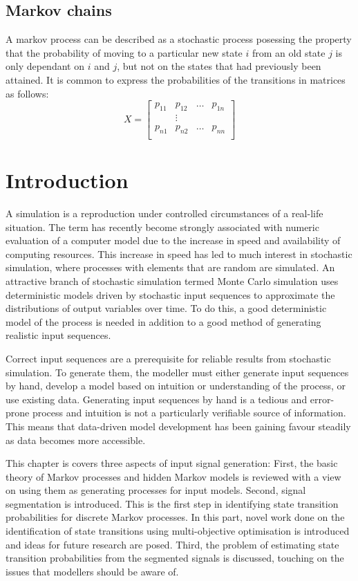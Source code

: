 \subsection{Markov chains}
A markov process can be described as a stochastic process posessing the
property that the probability of moving to a particular new state $i$ from an
old state $j$ is only dependant on $i$ and $j$, but not on the states that had
previously been attained.  It is common to express the probabilities of the
transitions in matrices as follows:
\begin{equation}
X = \left [ \begin{array}{cccc}
            p_{11} & p_{12}	& \ldots & p_{1n} \\
            & \vdots & \\
            p_{n1} & p_{n2} & \ldots & p_{nn}\\ 
            \end{array}\right]
\end{equation}

\section{Introduction}
A simulation is a reproduction under controlled circumstances of a
real-life situation.  The term has recently become strongly associated
with numeric evaluation of a computer model due to the increase in
speed and availability of computing resources.  This increase in speed
has led to much interest in stochastic simulation, where processes
with elements that are random are simulated.  An attractive branch of
stochastic simulation termed Monte Carlo simulation uses deterministic
models driven by stochastic input sequences to approximate the
distributions of output variables over time.  To do this, a good
deterministic model of the process is needed in addition to a good
method of generating realistic input sequences.

Correct input sequences are a prerequisite for reliable results from
stochastic simulation.  To generate them, the modeller must either
generate input sequences by hand, develop a model based on intuition
or understanding of the process, or use existing data.  Generating
input sequences by hand is a tedious and error-prone process and
intuition is not a particularly verifiable source of information.
This means that data-driven model development has been gaining favour
steadily as data becomes more accessible.

This chapter is covers three aspects of input signal generation:
First, the basic theory of Markov processes and hidden Markov models
is reviewed with a view on using them as generating processes for
input models. Second, signal segmentation is introduced.  This is the
first step in identifying state transition probabilities for discrete
Markov processes.  In this part, novel work done on the identification
of state transitions using multi-objective optimisation is introduced
and ideas for future research are posed. Third, the problem of
estimating state transition probabilities from the segmented signals
is discussed, touching on the issues that modellers should be aware
of.

